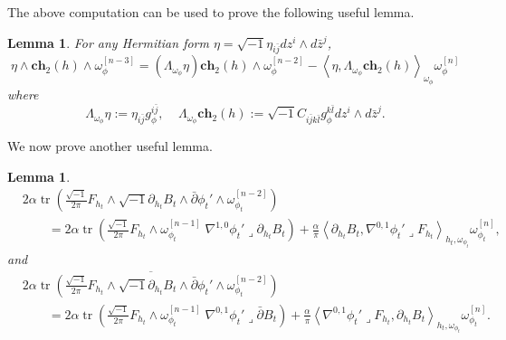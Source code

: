 \documentclass[10pt, letterpaper]{amsart}
\newcommand{\tr}{\operatorname{tr}}
\theoremstyle{plain}
\newtheorem{lemma}[theorem]{Lemma}
\theoremstyle{definition}
\numberwithin{equation}{section}
\begin{document}
The above computation can be used to prove the following useful lemma. 
\begin{lemma}
 For any Hermitian form $\eta=\sqrt{-1}\eta_{i\bar j}dz^i\wedge d\bar z^j$, 
 \[
 \eta\wedge \mathbf{ch}_2\left(h\right)\wedge\omega_\phi^{[n-3]}
 =
 \left(\Lambda_{\omega_\phi}\eta\right) \mathbf{ch}_2\left(h\right)\wedge\omega_\phi^{[n-2]}
 -
 \left\langle \eta, \Lambda_{\omega_\phi}\mathbf{ch}_2\left(h\right)\right\rangle_{\omega_\phi}\omega_\phi^{[n]}
 \]
 where 
 \[
 \Lambda_{\omega_\phi}\eta
 :=
 \eta_{i\bar j}g_\phi^{i\bar j},
 \;\;\;\;
 \Lambda_{\omega_\phi}\mathbf{ch}_2\left(h\right)
 :=
\sqrt{-1} C_{i\bar jk\bar l}g_\phi^{k\bar l}dz^i\wedge d\bar z^j.
 \]
\end{lemma}
We now prove another useful lemma.

\begin{lemma}
	\label{lem:mixed}
	\begin{equation*}
	\begin{split}
    & 2\alpha   \tr \left(\frac{\sqrt{-1}}{2\pi}F_{h_t}\wedge \sqrt{-1}\partial_{h_t}B_t\wedge \bar\partial \phi_t' \wedge \omega_{\phi_t}^{[n-2]}\right)\\
	& 
	\qquad =
	2\alpha \tr \left( \frac{\sqrt{-1}}{2\pi} F_{h_t}\wedge \omega_{\phi_t}^{[n-1]}\; \nabla^{1,0}\phi_t'\lrcorner \partial_{h_t} B_t\right)
	+\frac{\alpha}{\pi}
	\left\langle \partial_{h_t} B_t, \nabla^{0,1}\phi_t'\lrcorner F_{h_t}\right\rangle_{h_t,\omega_{\phi_t}}\omega_{\phi_t}^{[n]},
	\end{split}
	\end{equation*}
and
    \begin{align*}
   &\overline{2\alpha   \tr \left(\frac{\sqrt{-1}}{2\pi}F_{h_t}\wedge \sqrt{-1}\partial_{h_t}B_t\wedge \bar\partial \phi_t' \wedge \omega_{\phi_t}^{[n-2]}\right)} \\
    & \qquad =
	2\alpha \tr \left( \frac{\sqrt{-1}}{2\pi} F_{h_t}\wedge \omega_{\phi_t}^{[n-1]}\; \nabla^{0,1}\phi_t'\lrcorner\bar\partial B_t\right)
	+\frac{\alpha}{\pi}
	\left\langle \nabla^{0,1}\phi_t'\lrcorner F_{h_t}, \partial_{h_t} B_t\right\rangle_{h_t,\omega_{\phi_t}}\omega_{\phi_t}^{[n]}.
    \end{align*}

\end{lemma}
\end{document}

